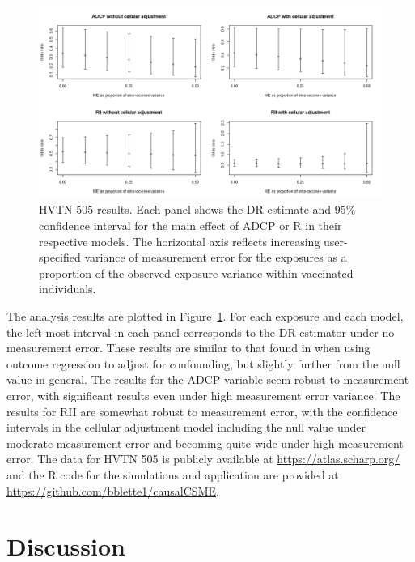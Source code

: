\documentclass[useAMS,usenatbib,referee]{biom}
\newcommand{\RNum}[1]{\uppercase\expandafter{\romannumeral #1\relax}}
\begin{document}
\begin{figure}[h!]
\centering
\includegraphics[width=6.9in]{Figure2.png}
\caption{HVTN 505 results. Each panel shows the DR estimate and 95$\%$ confidence interval for the main effect of ADCP or R\RNum{2} in their respective models. The horizontal axis reflects increasing user-specified variance of measurement error for the exposures as a proportion of the observed exposure variance within vaccinated individuals.}
\label{fig:two}
\end{figure}

The analysis results are plotted in Figure~\ref{fig:two}. For each exposure and each model, the left-most interval in each panel corresponds to the DR estimator under no measurement error. These results are similar to that found in \citet{neidich2019} when using outcome regression to adjust for confounding, but slightly further from the null value in general. The results for the ADCP variable seem robust to measurement error, with significant results even under high measurement error variance. The results for RII are somewhat robust to measurement error, with the confidence intervals in the cellular adjustment model including the null value under moderate measurement error and becoming quite wide under high measurement error. The data for HVTN 505 is publicly available at \href{https://atlas.scharp.org/cpas/project/HVTN\%20Public\%20Data/HVTN\%20505/begin.view?}{https://atlas.scharp.org/} and the R code for the simulations and application are provided at \href{https://github.com/bblette1/causalCSME}{https://github.com/bblette1/causalCSME}.

\section{Discussion}
\end{document}
